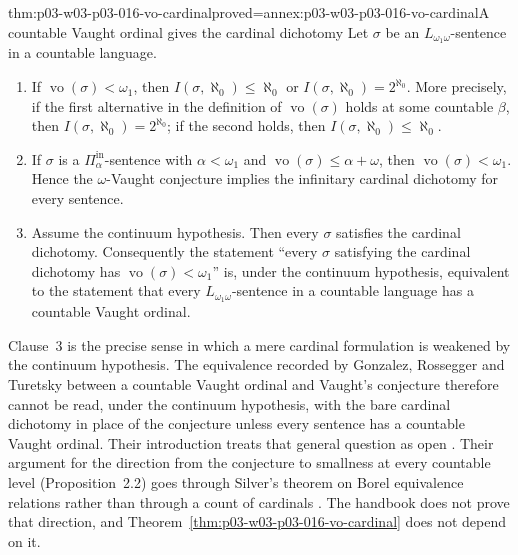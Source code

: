 \begin{hbtheorem}{thm:p03-w03-p03-016-vo-cardinal}{proved=annex:p03-w03-p03-016-vo-cardinal}{A countable Vaught ordinal gives the cardinal dichotomy}
Let \(\sigma\) be an \(L_{\omega_1\omega}\)-sentence in a countable language.
\begin{enumerate}
  \item If \(\operatorname{vo}(\sigma)<\omega_1\), then
        \(I(\sigma,\aleph_0)\leq\aleph_0\) or
        \(I(\sigma,\aleph_0)=2^{\aleph_0}\). More precisely, if the first
        alternative in the definition of \(\operatorname{vo}(\sigma)\) holds
        at some countable \(\beta\), then
        \(I(\sigma,\aleph_0)=2^{\aleph_0}\); if the second holds, then
        \(I(\sigma,\aleph_0)\leq\aleph_0\).
  \item If \(\sigma\) is a \(\Pi^{\mathrm{in}}_\alpha\)-sentence with
        \(\alpha<\omega_1\) and
        \(\operatorname{vo}(\sigma)\leq\alpha+\omega\), then
        \(\operatorname{vo}(\sigma)<\omega_1\). Hence the
        \(\omega\)-Vaught conjecture implies the infinitary cardinal
        dichotomy for every sentence.
  \item Assume the continuum hypothesis. Then every \(\sigma\) satisfies the
        cardinal dichotomy. Consequently the statement ``every
        \(\sigma\) satisfying the cardinal dichotomy has
        \(\operatorname{vo}(\sigma)<\omega_1\)'' is, under the continuum
        hypothesis, equivalent to the statement that every
        \(L_{\omega_1\omega}\)-sentence in a countable language has a
        countable Vaught ordinal.
\end{enumerate}
\end{hbtheorem}

Clause~3 is the precise sense in which a mere cardinal formulation is
weakened by the continuum hypothesis. The equivalence recorded by Gonzalez,
Rossegger and Turetsky between a countable Vaught ordinal and Vaught's
conjecture \cite[pp.~2, 6]{GonzalezRosseggerTuretsky2026Status} therefore
cannot be read, under the continuum hypothesis, with the bare cardinal
dichotomy in place of the conjecture unless every sentence has a countable
Vaught ordinal. Their introduction treats that general question as open
\cite[p.~1]{GonzalezRosseggerTuretsky2026Status}. Their argument for the
direction from the conjecture to smallness at every countable level
(Proposition~2.2) goes through Silver's theorem on Borel equivalence
relations rather than through a count of cardinals
\cite[p.~7]{GonzalezRosseggerTuretsky2026Status}. The handbook does not
prove that direction, and Theorem~\ref{thm:p03-w03-p03-016-vo-cardinal}
does not depend on it.

